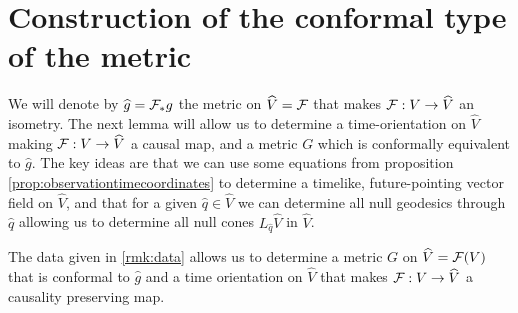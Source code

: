 \section{Construction of the conformal type of the metric}
We will denote by $\widehat{g}=\mathcal{F}_*g$ the metric on $\widehat{V}=\mathcal{F}$ that makes $\mathcal{F}:V\to \widehat{V}$ an isometry. The next lemma will allow us to determine a time-orientation on $\widehat{V}$ making $\mathcal{F}:V\to \widehat{V}$ a causal map, and a metric $G$ which is conformally equivalent to $\widehat{g}$. The key ideas are that we can use some equations from proposition \ref{prop:observationtimecoordinates} to determine a timelike, future-pointing vector field on $\widehat{V}$, and that for a given $\widehat{q}\in \widehat{V}$ we can determine all null geodesics through $\widehat{q}$ allowing us to determine all null cones $L_{\widehat{q}}\widehat{V}$ in $\widehat{V}$.
\begin{lemma}\label{lem:constructmetric}
The data given in \ref{rmk:data} allows us to determine a metric $G$ on $\widehat{V}=\mathcal{F}(V)$ that is conformal to $\widehat{g}$ and a time orientation on $\widehat{V}$ that makes $\mathcal{F}:V\to \widehat{V}$ a causality preserving map.
\end{lemma}
